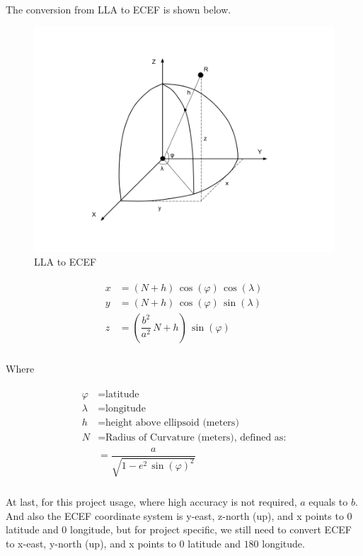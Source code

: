 The conversion from LLA to ECEF is shown below.

\begin{figure}[H]
\caption{LLA to ECEF}
\label{fig:lla2ecef}
\centering
\includegraphics[width=\linewidth]{Figures/lla2ecef.png}
\decoRule
\end{figure}

\[
\begin{array}{lr}
\begin{aligned}
x &= (N + h)\,\cos(\varphi)\,\cos(\lambda)\\
y &= (N + h)\,\cos(\varphi)\,\sin(\lambda)\\
z &= (\dfrac{b^2}{a^2}\,N + h)\,\sin(\varphi)\\
\end{aligned}
\end{array}
\]

Where

\[
\begin{array}{lr}
\begin{aligned}
\varphi &= \text{latitude}\\
\lambda &= \text{longitude}\\
h &= \text{height above ellipsoid (meters)}\\
N &= \text{Radius of Curvature (meters), defined as:}\\
&= \dfrac{a}{\sqrt{1 - e^2\,\sin(\varphi)^2}}\\
\end{aligned}
\end{array}
\]

At last, for this project usage, where high accuracy is not required, $a$ equals to $b$. And also the ECEF coordinate system is y-east, z-north (up), and x points to $0$ latitude and $0$ longitude, but for project specific, we still need to convert ECEF to x-east, y-north (up), and x points to $0$ latitude and $180$ longitude.

